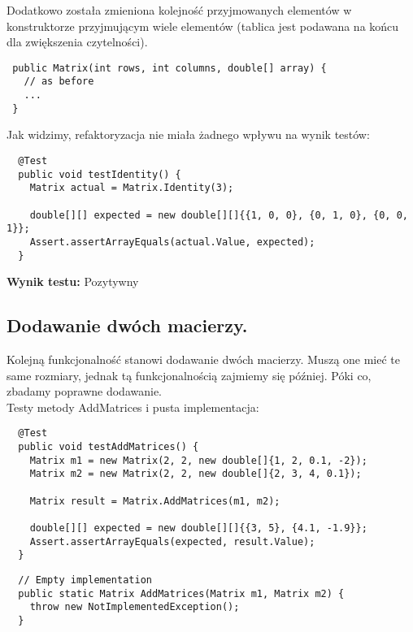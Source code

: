 \documentclass[a4paper,12pt,twoside]{article}
\begin{document}
\noindent
Dodatkowo została zmieniona kolejność przyjmowanych elementów w konstruktorze przyjmującym
wiele elementów (tablica jest podawana na końcu dla zwiększenia czytelności).

\begin{lstlisting}
 public Matrix(int rows, int columns, double[] array) {
   // as before
   ...
 }
\end{lstlisting}
\medskip

\noindent
Jak widzimy, refaktoryzacja nie miała żadnego wpływu na wynik testów:\\

\begin{lstlisting}
  @Test
  public void testIdentity() {
    Matrix actual = Matrix.Identity(3);

    double[][] expected = new double[][]{{1, 0, 0}, {0, 1, 0}, {0, 0, 1}};
    Assert.assertArrayEquals(actual.Value, expected);
  }
\end{lstlisting}
\medskip

\noindent
\textbf{Wynik testu: }{\color{green} Pozytywny}


\subsection{Dodawanie dwóch macierzy.}
\bigskip


Kolejną funkcjonalność stanowi dodawanie dwóch macierzy. Muszą one mieć te same
rozmiary, jednak tą funkcjonalnością zajmiemy się później. Póki co, zbadamy poprawne
dodawanie.\\

\noindent
Testy metody AddMatrices i pusta implementacja:\\

\begin{lstlisting}
  @Test
  public void testAddMatrices() {
    Matrix m1 = new Matrix(2, 2, new double[]{1, 2, 0.1, -2});
    Matrix m2 = new Matrix(2, 2, new double[]{2, 3, 4, 0.1});

    Matrix result = Matrix.AddMatrices(m1, m2);

    double[][] expected = new double[][]{{3, 5}, {4.1, -1.9}};
    Assert.assertArrayEquals(expected, result.Value);
  }
\end{lstlisting}

\begin{lstlisting}
  // Empty implementation
  public static Matrix AddMatrices(Matrix m1, Matrix m2) {
    throw new NotImplementedException();
  }
\end{lstlisting}
\medskip
\end{document}
